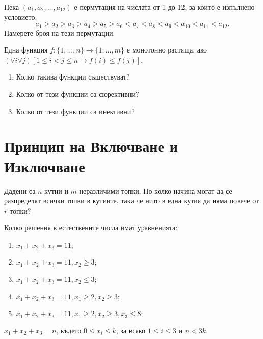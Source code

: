 
\begin{problem}
  Нека $(a_1,a_2,\dots,a_{12})$ е пермутация на числата от 1 до 12, за които е изпълнено условието:
  \[a_1 > a_2 > a_3 > a_4 > a_5 > a_6 < a_7 < a_8 < a_9 < a_{10} < a_{11} < a_{12}.\]
  Намерете броя на тези пермутации.  
\end{problem}

\begin{problem}
  Една функция $f:\{1,\dots,n\}\to\{1,\dots,m\}$ е монотонно растяща, ако
  $(\forall i\forall j)[1\leq i<j\leq n \rightarrow f(i)\leq f(j) ]$.
  \begin{enumerate}
  \item
    Колко такива функции съществуват?
  \item
    Колко от тези функции са сюрективни?
  \item
    Колко от тези функции са инективни?
\end{enumerate}
\end{problem}


\section{Принцип на Включване и Изключване}

\begin{problem}
  Дадени са $n$ кутии и $m$ неразличими топки.
  По колко начина могат да се разпределят всички топки в кутиите, така че нито в една кутия да няма повече от $r$ топки?
\end{problem}

\begin{problem}
  Колко решения в естествените числа имат уравненията:
  \begin{enumerate}
  \item
    $x_1+x_2+x_3 = 11$;
  \item
    $x_1 + x_2 + x_3 = 11, x_2 \geq 3$;
  \item
    $x_1+x_2+x_3 = 11, x_2 \leq 3$;
  \item
    $x_1+x_2+x_3 = 11, x_1 \geq 2, x_2 \geq 3$;
  \item
    $x_1+x_2+x_3 = 11, x_1 \geq 2, x_2 \geq 3, x_3 \leq 8$;
  \end{enumerate}
\end{problem}

\begin{problem}
  $x_1 + x_2 + x_3 = n$, където
  $0\leq x_i \leq k$, за всяко $1\leq i \leq 3$ и $n < 3k$.
\end{problem}

